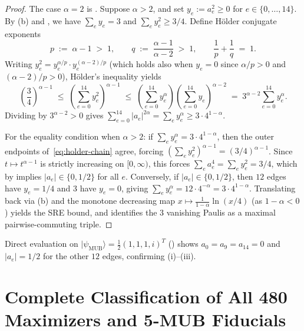 \documentclass[11pt,a4paper]{article}
\theoremstyle{plain}
\theoremstyle{definition}
\theoremstyle{remark}
\newcommand{\ket}[1]{\lvert #1 \rangle}
\newcommand{\psimub}{\ket{\psi_{\mathrm{MUB}}}}
\begin{document}
\begin{proof}
The case $\alpha = 2$ is . Suppose $\alpha > 2$, and set $y_e := a_e^2 \ge 0$ for $e \in \{0,\dots,14\}$. By (b) and , we have $\sum_{e} y_e = 3$ and $\sum_{e} y_e^2 \ge 3/4$. Define H\"older conjugate exponents
\[
  p \;:=\; \alpha - 1 \;>\; 1, \qquad q \;:=\; \frac{\alpha - 1}{\alpha - 2} \;>\; 1, \qquad \frac{1}{p} + \frac{1}{q} \;=\; 1.
\]
Writing $y_e^2 = y_e^{\alpha/p} \cdot y_e^{(\alpha - 2)/p}$ (which holds also when $y_e = 0$ since $\alpha/p > 0$ and $(\alpha-2)/p > 0$), H\"older's inequality yields
\begin{equation}
  \label{eq:holder-chain}
  \left(\frac{3}{4}\right)^{\!\alpha-1}
  \;\le\; \left(\sum_{e=0}^{14} y_e^2\right)^{\!\alpha-1}
  \;\le\; \left(\sum_{e=0}^{14} y_e^\alpha\right) \left(\sum_{e=0}^{14} y_e\right)^{\!\alpha-2}
  \;=\; 3^{\alpha-2} \sum_{e=0}^{14} y_e^\alpha.
\end{equation}
Dividing by $3^{\alpha - 2} > 0$ gives $\sum_{e=0}^{14} \lvert a_e\rvert^{2\alpha} = \sum_e y_e^\alpha \ge 3 \cdot 4^{1-\alpha}$.

For the equality condition when $\alpha > 2$: if $\sum_e y_e^\alpha = 3 \cdot 4^{1-\alpha}$, then the outer endpoints of~\eqref{eq:holder-chain} agree, forcing $(\sum_e y_e^2)^{\alpha - 1} = (3/4)^{\alpha - 1}$. Since $t \mapsto t^{\alpha-1}$ is strictly increasing on $[0, \infty)$, this forces $\sum_e a_e^4 = \sum_e y_e^2 = 3/4$, which by  implies $\lvert a_e\rvert \in \{0, 1/2\}$ for all $e$. Conversely, if $\lvert a_e\rvert \in \{0, 1/2\}$, then $12$ edges have $y_e = 1/4$ and $3$ have $y_e = 0$, giving $\sum_e y_e^\alpha = 12 \cdot 4^{-\alpha} = 3 \cdot 4^{1-\alpha}$. Translating back via (b) and the monotone decreasing map $x \mapsto \frac{1}{1-\alpha}\ln(x/4)$ (as $1-\alpha < 0$) yields the SRE bound, and  identifies the $3$ vanishing Paulis as a maximal pairwise-commuting triple.
\end{proof}

Direct evaluation on $\psimub = \frac{1}{2}(1,1,1,i)^T$ () shows $a_0 = a_9 = a_{14} = 0$ and $\lvert a_e\rvert = 1/2$ for the other $12$ edges, confirming (i)--(iii).

\section{Complete Classification of All 480 Maximizers and 5-MUB Fiducials}
\label{sec:maximizers}
\end{document}

